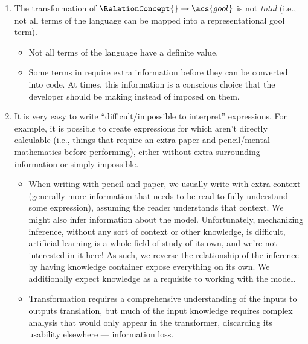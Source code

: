 \begin{enumerate}

	\item The transformation of \(\RelationConcept{} \rightarrow \acs{gool}\) is
	      not \textit{total} (i.e., not all terms of the \Expr{} language can be
	      mapped into a representational \acs{gool} term).

	      \begin{itemize}

		      \item Not all terms of the \Expr{} language have a definite value.

		      \item Some terms in \Expr{} require extra information before they
		            can be converted into code. At times, this information is a
		            conscious choice that the developer should be making instead
		            of imposed on them.

	      \end{itemize}

	\item It is very easy to write ``difficult/impossible to interpret''
	      expressions. For example, it is possible to create expressions for
	      which aren't directly calculable (i.e., things that require an extra
	      paper and pencil/mental mathematics before performing), either without
	      extra surrounding information or simply impossible.

	      \begin{itemize}

		      \item When writing with pencil and paper, we usually write with
		            extra context (generally more information that needs to be
		            read to fully understand some expression), assuming the
		            reader understands that context. We might also infer
		            information about the model. Unfortunately, mechanizing
		            inference, without any sort of context or other knowledge,
		            is difficult, artificial learning is a whole field of study
		            of its own, and we're not interested in it here! As such, we
		            reverse the relationship of the inference by having
		            knowledge container expose everything on its own. We
		            additionally expect knowledge as a requisite to working with
		            the model.

		      \item Transformation requires a comprehensive understanding of the
		            inputs to outputs translation, but much of the input
		            knowledge requires complex analysis that would only appear
		            in the transformer, discarding its usability elsewhere —
		            information loss.


\end{itemize}
\end{enumerate}
